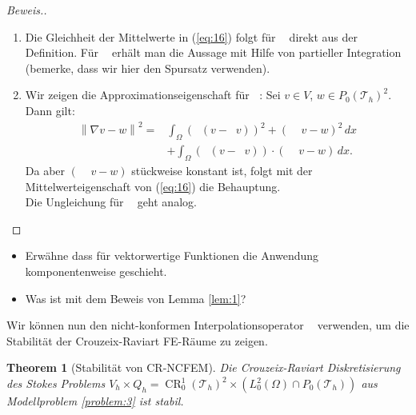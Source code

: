 \message{ !name(script.tex)}\documentclass[a4paper]{scrartcl}
\newcommand{\Ltwo}{L^2}
\newcommand{\crfem}{\operatorname{CR}_0^1}
\newcommand{\mesh}{\mathcal{T}_h}
\newcommand{\dx}{\,dx}
\newcommand{\norm}[1]{\left\lVert#1\right\rVert}
\DeclareMathOperator{\nablah}{\nabla_{\textit{h}}}
\DeclareMathOperator{\intOp}{I_{NC}}
\DeclareMathOperator{\LtwoOp}{\Pi_0}
\theoremstyle{plain}
\newtheorem{theorem}{Theorem}
\theoremstyle{definition}
\theoremstyle{remark}
\begin{document}
\begin{proof}[Beweis.]
  \begin{enumerate}[label=\emph{(\roman*)}]
  \item Die Gleichheit der Mittelwerte in (\ref{eq:16}) folgt für
    \(\LtwoOp\) direkt aus der Definition. Für \(\intOp\) erhält man die
    Aussage mit Hilfe von partieller Integration (bemerke, dass wir hier
    den Spursatz verwenden).
  \item Wir zeigen die Approximationseigenschaft für \(\intOp\): Sei
    \(v \in V\), \(w\in P_0(\mesh)^2\). Dann gilt: 
    \begin{align}
      \norm{\nabla v - w}^2 =& \int_\Omega \left(\nablah(v - \intOp v)\right)^2 + \left(\nablah \intOp v - w\right)^2 \dx \nonumber \\ 
      & + \int_\Omega \left(\nablah(v - \intOp v)\right) \cdot \left(\nablah \intOp v - w\right) \dx. \nonumber
    \end{align}
    Da aber \(\left(\nablah \intOp v - w\right)\) stückweise konstant
    ist, folgt mit der Mittelwerteigenschaft von (\ref{eq:16}) die
    Behauptung. \\
    Die Ungleichung für \(\LtwoOp\) geht analog. 
\end{enumerate}
\end{proof}


{\color{red}
  \begin{itemize}
  \item Erwähne dass für vektorwertige Funktionen die Anwendung
    komponentenweise geschieht.
  \item Was ist mit dem Beweis von Lemma \ref{lem:1}? 
  \end{itemize}
}

\noindent Wir können nun den nicht-konformen Interpolationsoperator \(\intOp\)
verwenden, um die Stabilität der Crouzeix-Raviart FE-Räume zu zeigen. 

\begin{theorem}[Stabilität von CR-NCFEM]\label{thm:3}
  Die Crouzeix-Raviart Diskretisierung des Stokes Problems \(V_h \times Q_h =
  \crfem(\mesh)^2 \times (\Ltwo_0(\Omega)\cap P_0(\mesh))\) aus
  Modellproblem \ref{problem:3}  ist stabil. 
\end{theorem}
\end{document}
